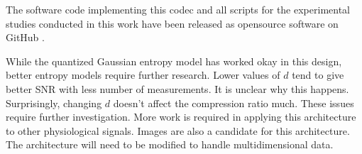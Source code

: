 The software code implementing this codec
and all scripts for the experimental studies conducted
in this work have been released as opensource software
on GitHub \cite{kumar2022ecgcodec}.

While the quantized Gaussian entropy model has worked okay in this
design, better entropy models require further research.
Lower values of $d$ tend to give better SNR with less number
of measurements. It is unclear why this happens. Surprisingly,
changing $d$ doesn't affect the compression ratio much.
These issues require further investigation.
More work is required in applying this architecture to other
physiological signals. Images are also a candidate for this
architecture. The architecture will need to be modified
to handle multidimensional data. 
